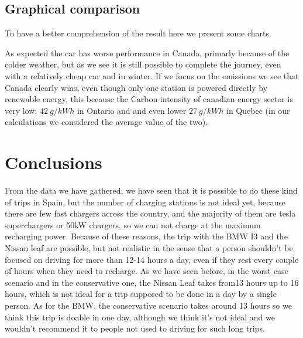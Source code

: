 \documentclass{article}
\begin{document}
\subsection{Graphical comparison}
To have a better comprehension of the result here we present some charts.
\begin{figure}[H]
\end{figure}
As expected the car has worse performance in Canada, primarly because of the colder weather, but as we see it is still possible to complete the journey, even with a relatively cheap car and in winter. 
If we focus on the emissions we see that Canada clearly wins, even though only one station is powered directly by renewable energy, this because the Carbon intensity of canadian energy sector is very low: $42\:g/kWh$ in Ontario and and even lower $27\:g/kWh$ in Quebec \cite{canada} (in our calculations we considered the average value of the two).
\section{Conclusions}

From the data we have gathered, we have seen that it is possible to do these kind of trips in Spain, but the number of charging stations is not ideal yet, because there are few fast chargers across the country, and the majority of them are tesla superchargers or 50kW chargers, so we can not charge at the maximum recharging power. Because of these reasons, the trip with the BMW I3 and the Nissan leaf are possible, but not realistic in the sense that a person shouldn't be focused on driving for more than 12-14 hours a day, even if they rest every couple of hours when they need to recharge. As we have seen before, in the worst case scenario and in the conservative one, the Nissan Leaf takes from13 hours up to 16 hours, which is not ideal for a trip supposed to be done in a day by a single person. As for the BMW, the conservative scenario takes around 13 hours so we think this trip is doable in one day, although we think it’s not ideal and we wouldn’t recommend it to people not used to driving for such long trips.\\
\end{document}
